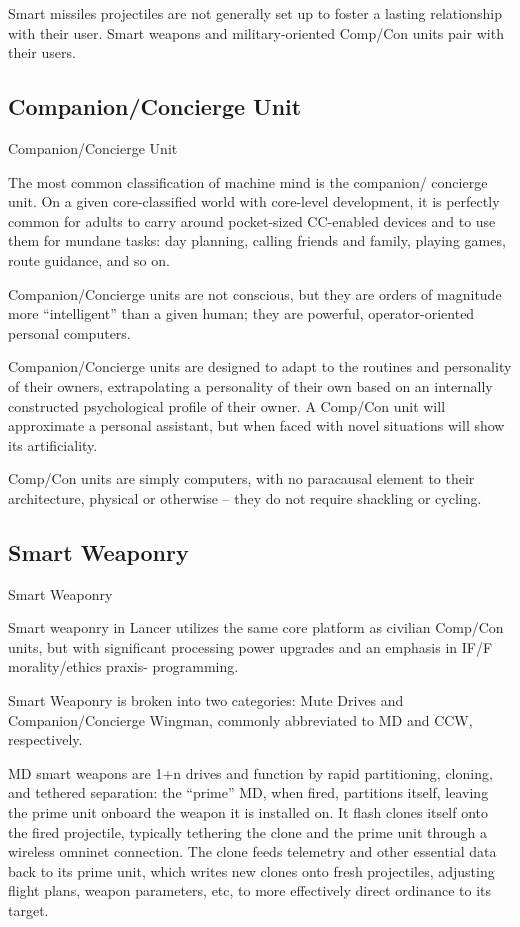 Smart missiles projectiles are not generally set up to foster a lasting relationship with their user.  
Smart weapons and military-oriented Comp/Con units pair with their users. 
 
\subsection{Companion/Concierge Unit}
Companion/Concierge Unit  

The most common classification of machine mind is the companion/ concierge unit. On a given  
core-classified world with core-level development, it is perfectly common for adults to carry  
around pocket-sized CC-enabled devices and to use them for mundane tasks: day planning,  
calling friends and family, playing games, route guidance, and so on. 
 

Companion/Concierge units are not conscious, but they are orders of magnitude more  
“intelligent” than a given human; they are powerful, operator-oriented personal computers. 
 

Companion/Concierge units are designed to adapt to the routines and personality of their  
owners, extrapolating a personality of their own based on an internally constructed psychological  
profile of their owner. A Comp/Con unit will approximate a personal assistant, but when faced  
with novel situations will show its artificiality. 
 

Comp/Con units are simply computers, with no paracausal element to their architecture, physical  
or otherwise -- they do not require shackling or cycling. 
 

                                                                                                         
\subsection{Smart Weaponry  }

Smart Weaponry  

Smart weaponry in Lancer utilizes the same core platform as civilian Comp/Con units, but with  
significant processing power upgrades and an emphasis in IF/F morality/ethics praxis- 
programming.  
 

Smart Weaponry is broken into two categories: Mute Drives and Companion/Concierge  
Wingman, commonly abbreviated to MD and CCW, respectively.  
 

MD smart weapons are 1+n drives and function by rapid partitioning, cloning, and tethered  
separation: the “prime” MD, when fired, partitions itself, leaving the prime unit onboard the  
weapon it is installed on. It flash clones itself onto the fired projectile, typically tethering the clone  
and the prime unit through a wireless omninet connection. The clone feeds telemetry and other  
essential data back to its prime unit, which writes new clones onto fresh projectiles, adjusting  
flight plans, weapon parameters, etc, to more effectively direct ordinance to its target.   
 

